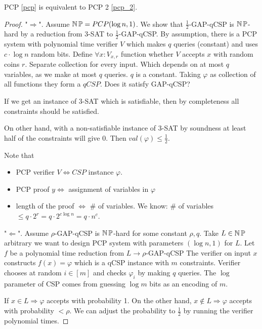 \begin{theorem}
	PCP \cref{pcp} is equivalent to PCP 2 \cref{pcp_2}.
\end{theorem}
\begin{proof}
	"$\Rightarrow$". Assume $ \operatorname{\operatorname{\mathbb{N}}\mathbb{P}} = PCP (\log n, 1)$.
	We show that $\frac{1}{2}$-GAP-qCSP is $\operatorname{\operatorname{\mathbb{N}}\mathbb{P}}$-hard by a reduction from 3-SAT to $\frac{1}{2}$-GAP-qCSP.
	By assumption, there is a PCP system with polynomial time verifier $V$ which makes $q$ queries (constant) and uses $c \cdot \log n$ random bits.
	Define $\forall x: V_{x, r}$ function whether $V$ accepts $x$ with random coins $r$.
	Separate collection for every input.
	Which depends on at most $q$ variables, as we make at most $q$ queries. $q$ is a constant.
	Taking $\varphi$ as collection of all functions they form a $qCSP$.
	Does it satisfy GAP-qCSP?

	If we get an instance of 3-SAT which is satisfiable, then by completeness all constraints should be satisfied.

	On other hand, with a non-satisfiable instance of 3-SAT by soundness at least half of the constraints will give 0. Then $val(\varphi) \leq \frac{1}{2}$.

	Note that
	\begin{itemize}
		\item PCP verifier $V \iff CSP$ instance $\varphi$.
		\item PCP proof $y \iff$ assignment of variables in $\varphi$
		\item length of the proof $\iff$ \# of variables.
			We know: \# of variables $\leq q \cdot 2^r = q \cdot 2^{c \log n} = q \cdot n^c$.
	\end{itemize}

	"$\Leftarrow$". Assume $ \rho$-GAP-qCSP is $\operatorname{\operatorname{\mathbb{N}}\mathbb{P}}$-hard for some constant $\rho, q$.
	Take $L \in \operatorname{\operatorname{\mathbb{N}}\mathbb{P}}$ arbitrary we want to design PCP system with parameters $(\log n, 1)$ for $L$.
	Let $f$ be a polynomial time reduction from $L \to \rho$-GAP-qCSP
	The verifier on input $x$ constructs $f(x) = \varphi$ which is a qCSP instance with $m$ constraints.
	Verifier chooses at random $i \in [m]$ and checks $\varphi_i$ by making $q$ queries.
	The $\log$ parameter of CSP comes from guessing $\log m$ bits as an encoding of $m$.

	If $x \in L \Rightarrow \varphi$ accepts with probability 1.
	On the other hand, $x \notin L \Rightarrow \varphi $ accepts with probability $< \rho$.
	We can adjust the probability to $\frac{1}{2}$ by running the verifier polynomial times.
\end{proof}

